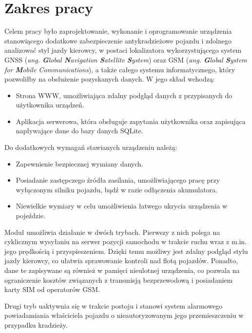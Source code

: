 \section{Zakres pracy}
\label{project_sketch}
Celem pracy było zaprojektowanie, wykonanie i oprogramowanie urządzenia stanowiącego dodatkowe zabezpieczenie antykradzieżowe pojazdu i zdolnego analizować styl jazdy kierowcy, w postaci lokalizatora wykorzystującego system GNSS (\textit{ang. \textbf{G}lobal \textbf{N}avigation \textbf{S}atellite \textbf{S}ystem}) oraz GSM (\textit{ang. \textbf{G}lobal \textbf{S}ystem for \textbf{M}obile Communications}), a także całego systemu informatycznego, który pozwoliłby na obsłużenie pozyskanych danych. W jego skład wchodzą:

\begin{itemize}
\item Strona WWW, umożliwiająca zdalny podgląd danych z przypisanych do użytkownika urządzeń.
\item Aplikacja serwerowa, która obsługuje zapytania użytkownika oraz zapisująca napływające dane do bazy danych SQLite.
\end{itemize}

Do dodatkowych wymagań stawianych urządzeniu należą:

\begin{itemize}
\item Zapewnienie bezpiecznej wymiany danych.
\item Posiadanie zastępczego źródła zasilania, umożliwiającego pracę przy wyłączonym silniku pojazdu, bądź w razie odłączenia akumulatora.
\item Niewielkie wymiary w celu umożliwienia łatwego ukrycia urządzenia w pojeździe. 
\end{itemize}

Moduł umożliwia działanie w dwóch trybach. Pierwszy z nich polega na cyklicznym wysyłaniu na serwer pozycji samochodu w trakcie ruchu wraz z m.in. jego prędkością i przyspieszeniem. Dzięki temu możliwy jest zdalny podgląd stylu jazdy kierowcy, co ułatwia sprawowanie kontroli nad flotą pojazdów. Ponadto, dane te zapisywane są również w pamięci nieulotnej urządzenia, co pozwala na ograniczenie kosztów związanych z transmisją bezprzewodową i posiadaniem karty SIM od operatorów GSM. 

Drugi tryb uaktywnia się w trakcie postoju i stanowi system alarmowego powiadamiania właściciela pojazdu o nieautoryzowanym jego przemieszczeniu w przypadku kradzieży.

